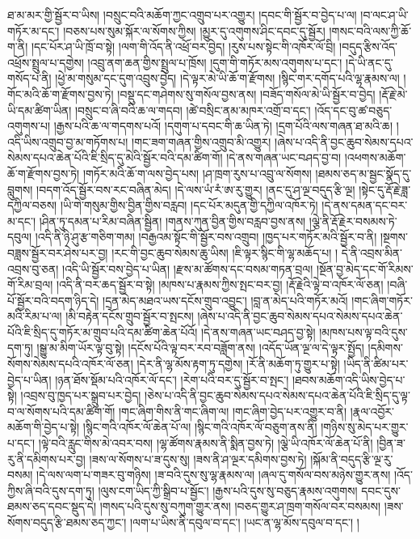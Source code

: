 ཐ་མ་མར་གྱི་སྦྱོར་བ་ཡིས། །བསྲུང་བའི་མཆོག་ཀྱང་འགྲུབ་པར་འགྱུར། །དབང་གི་སྦྱོར་བ་བྱེད་པ་ལ། །བ་ལང་ཤ་ཡི་གཏོར་མ་དང་། །བཅས་པས་སུམ་སྐོར་ལ་སོགས་ཀྱིས། །མྱུར་དུ་འགུགས་ཤིང་དབང་དུ་སྦྱོར། །གསང་བའི་ལས་ཀྱི་ཆོ་ག་ནི། །དང་པོར་ཤ་ཡི་ཁྲོ་བ་སྟེ། །ལག་གི་འོད་ནི་འཕྲོ་བར་བྱེད། །རུས་པས་སྟེང་གི་འཁོར་ལོ་བྲི། །བདུད་རྩིས་འོད་འཕྲོས་སྤྲུལ་པ་དགྱེས། །འབྲུ་ནག་ཆན་གྱིས་སྤྲུལ་པ་ཁྲོས། །དུག་གི་གཏོར་མས་འགུགས་པ་དང་། །དེ་ཡི་ནང་དུ་གསོད་པ་ནི། །ཕྱེ་མ་གསུམ་དང་དུག་འབྲུས་བྱེད། །དེ་ལྟར་མེ་ཡི་ཆོ་ག་རྫོགས། །སྙིང་གར་དགོད་པའི་ལྷ་རྣམས་ལ། །གོང་མའི་ཆོ་ག་རྫོགས་བྱས་ཏེ། །བསྡུ་དང་གཤེགས་སུ་གསོལ་བྱས་ནས། །བཟོད་གསོལ་མེ་ཡི་སྦྱོར་བ་བྱེད། །རྡོ་རྗེ་མེ་ཡི་དམ་ཚིག་ཡིན། །བསྲུང་བ་ཞི་བའི་ཆ་ལ་གདབ། །ཚེ་བསྲིང་ནམ་མཁར་འགྲོ་བ་དང་། །འོད་དང་བུ་ཚ་བཅུད་འགུགས་པ། །རྒྱས་པའི་ཆ་ལ་གདགས་པའོ། །དགུག་པ་དབང་གི་ཆ་ཡིན་ཏེ། །དྲག་པོའི་ལས་གཞན་ཐ་མའི་ཆ། །འདི་ཡིས་འགྲུབ་བྱ་མ་གཏོགས་པ། །གང་ཟག་གཞན་གྱིས་འགྲུབ་མི་འགྱུར། །ཞེས་པ་འདི་ནི་བྱང་ཆུབ་སེམས་དཔའ་སེམས་དཔའ་ཆེན་པོའི་ཇི་སྲིད་དུ་མེའི་སྦྱོར་བའི་དམ་ཚིག་གོ། །དེ་ནས་གཞན་ཡང་བཤད་བྱ་བ། །འཕགས་མཆོག་ཆོ་ག་རྫོགས་བྱས་ཏེ། །གཏོར་མའི་ཆོ་ག་ལས་བྱེད་པས། །ཤ་ཁྲག་རུས་པ་འབྲུ་ལ་སོགས། །ཐམས་ཅད་མ་སྦྱང་སྣོད་དུ་བླུགས། །བདག་འོད་སྦྱོར་བས་རང་བཞིན་མེད། །དེ་ལས་ཡཾ་རཾ་ཨ་རུ་གྱུར། །ནང་དུ་ཤ་ལྔ་བདུད་རྩི་ལྔ། །སྟེང་དུ་རྡོ་རྗེ་ཟླ་དཀྱིལ་བཅས། །ཡི་གེ་གསུམ་གྱིས་བྱིན་གྱིས་བརླབ། །དང་པོར་མདུན་གྱི་དཀྱིལ་འཁོར་ཏེ། །དེ་ནས་དམན་དང་བར་མ་དང་། །ཤིན་ཏུ་དམན་པ་རིམ་བཞིན་སྦྱིན། །གནས་ཀུན་བྱིན་གྱིས་བརླབ་བྱས་ནས། །ལྕེ་ནི་རྡོ་རྗེར་བསམས་ཏེ་དབུལ། །འདི་ནི་ཉི་ཤུ་རྩ་གཅིག་གམ། །བརྒྱའམ་སྟོང་གི་སྦྱོར་བས་འགྲུབ། །ཁྱད་པར་གཏོར་མའི་སྦྱོར་བ་ནི། །སྔགས་བཟླས་སྦྱོར་བར་ཤེས་པར་བྱ། །རང་གི་བྱང་ཆུབ་སེམས་ཆུ་ཡིས། །ཇི་ལྟར་སྙིང་གི་ལྷ་མཆོད་པ། །
དེ་ནི་འབྲས་མིན་འབྲས་བུ་ཅན། །འདི་ཡི་སྦྱོར་བས་བྱེད་པ་ཡིན། །རྫས་མ་ཚོགས་དང་བསམ་གཏན་བྲལ། །སྔོན་བྱ་མེད་དང་{གོ་རིམས་གོ་རིམ་}བྲལ། །འདི་ནི་བར་ཆད་སྦྱོར་བ་སྟེ། །མཁས་པ་རྣམས་ཀྱིས་སྤང་བར་བྱ། །རྡོ་རྗེའི་ལྟེ་བ་འཁོར་ལོ་ཅན། །བཞི་པོ་སྦྱོར་བའི་བདག་ཉིད་དེ། །དྲན་མེད་མཐའ་ཡས་དངོས་གྲུབ་འབྱུང་། །བླ་ན་མེད་པའི་གཏོར་མའོ། །གང་ཞིག་གཏོར་མའི་རིམ་པ་ལ། །མི་བརྟེན་དངོས་གྲུབ་སྦྱོར་བ་སྤངས། །ཞེས་པ་འདི་ནི་བྱང་ཆུབ་སེམས་དཔའ་སེམས་དཔའ་ཆེན་པོའི་ཇི་སྲིད་དུ་གཏོར་མ་གྲུབ་པའི་དམ་ཚིག་ཆེན་པོའོ། །དེ་ནས་གཞན་ཡང་བཤད་བྱ་སྟེ། །མཁས་པས་ལྟ་བའི་དུས་དག་ཏུ། །སྒྱུ་མ་མིག་ཡོར་ལྟ་བུ་སྟེ། །དངོས་པོའི་ལྟ་བར་རབ་བཟློག་ནས། །འདོད་ཡོན་ལྔ་ལ་དེ་ལྟར་སྤྱོད། །དམིགས་སོགས་སེམས་དཔའི་འཁོར་ལོ་ཅན། །དེར་ནི་ལྷ་མོས་རྟག་ཏུ་དགྱེས། །རོ་ནི་མཆོག་ཏུ་གྱུར་པ་སྟེ། །ཡིད་ནི་ཚིམ་པར་བྱེད་པ་ཡིན། །ཉན་ཐོས་སྡོམ་པའི་འཁོར་ལོ་དང་། །རེག་པའི་བར་དུ་སྦྱོར་བ་སྤང་། །ཐབས་མཆོག་འདི་ཡིས་བྱེད་པ་སྟེ། །འབྲས་བུ་ཁྱད་པར་སྒྲུབ་པར་བྱེད། །ཅེས་པ་འདི་ནི་བྱང་ཆུབ་སེམས་དཔའ་སེམས་དཔའ་ཆེན་པོའི་ཇི་སྲིད་དུ་ལྟ་བ་ལ་སོགས་པའི་དམ་ཚིག་གོ། །གང་ཞིག་གིས་ནི་གང་ཞིག་ལ། །གང་ཞིག་བྱེད་པར་འགྱུར་བ་ནི། །རྣལ་འབྱོར་མཆོག་གི་བྱེད་པ་སྟེ། །སྙིང་གའི་འཁོར་ལོ་ཆེན་པོ་ལ། །སྙིང་གའི་འཁོར་ལོ་བཅུག་ནས་ནི། །གཉིས་སུ་མེད་པར་གྱུར་པ་དང་། །ལྟེ་བའི་རླུང་གིས་མེ་འབར་བས། །ལྷ་ཚོགས་རྣམས་ནི་སྨིན་བྱས་ཏེ། །ལྕེ་ཡི་འཁོར་ལོ་ཆེན་པོ་ནི། །བྱིན་ཟ་རུ་ནི་དམིགས་པར་བྱ། །ཟས་ལ་སོགས་པ་ཟ་དུས་སུ། །ཟས་ནི་ཤ་ལྔར་དམིགས་བྱས་ཏེ། །སྐོམ་ནི་བདུད་རྩི་ལྔ་རུ་བསམ། །དེ་ལས་ལག་པ་གཟར་བུ་གཉིས། །ཟ་བའི་དུས་སུ་ལྷ་རྣམས་ལ། །ཞལ་དུ་གསོལ་བས་མཉེས་གྱུར་ནས། །འོད་ཀྱིས་ཞི་བའི་དུས་དག་ཏུ། །ལུས་ངག་ཡིད་ཀྱི་སྒྲིབ་པ་སྦྱོང་། །རྒྱས་པའི་དུས་སུ་བཅུད་རྣམས་འགུགས། དབང་དུས་ཐམས་ཅད་དབང་སྡུད་དེ། །གསད་པའི་དུས་སུ་བཀུག་གྱུར་ནས། །བཅད་གྱུར་ཤ་ཁྲག་གསོལ་བར་བསམས། །ཟས་སོགས་བདུད་རྩི་ཐམས་ཅད་ཀྱང་། །ལག་པ་ཡིས་ནི་དབུལ་བ་དང་། །ཡང་ན་ལྷ་མོས་དབུལ་བ་དང་། །
